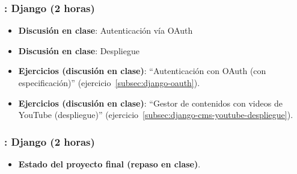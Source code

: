 \documentclass[a4paper,12pt]{article}
\begin{document}
\subsubsection{\lunesN: Django (2 horas)}
\label{cal:lunesN}

\begin{itemize}
\item \textbf{Discusión en clase}: Autenticación vía OAuth
\item \textbf{Discusión en clase}: Despliegue
\item \textbf{Ejercicios (discusión en clase)}: ``Autenticación con OAuth (con especificación)'' (ejercicio~\ref{subsec:django-oauth}).
\item \textbf{Ejercicios (discusión en clase)}: ``Gestor de contenidos con videos de YouTube (despliegue)'' (ejercicio~\ref{subsec:django-cms-youtube-despliegue}).
\end{itemize}

\subsubsection{\martesN: Django (2 horas)}
\label{cal:martesN}


\begin{itemize}
\item \textbf{Estado del proyecto final (repaso en clase)}.
\end{itemize}


\newpage



\end{document}
